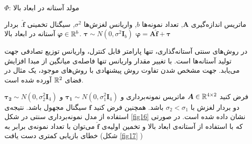 \begin{algorithm}
	\caption{$ \Phi $: مولد آستانه در ابعاد بالا}
	\label{alg:HDTG}
	\begin{algorithmic}[1]
		\renewcommand{\algorithmicrequire}{\textbf{ورودی:}}
		\renewcommand{\algorithmicensure}{\textbf{خروجی:}}
		\REQUIRE ماتریس اندازه‌گیری $ \bm{A} $, تعداد نمونه‌ها $ b $, واریانس لغزش‌ها $ \sigma^{2} $, سیگنال تخمینی $ \hat{\bm{f}} $.
		\ENSURE بردار آستانه در ابعاد بالا $\bm{\varphi}\in \mathbb{R}^{b}$.
		\STATE $ \bm{\tau}\sim N(0,\sigma^{2}\bm{I}_{b} ) $
		\STATE  $ \bm{\varphi}=\bm{A}\hat{\bm{f}}+\bm{\tau} $
	\end{algorithmic} 
\end{algorithm}


در روش‌های سنتی آستانه‌گذاری، تنها پارامتر قابل کنترل، واریانس توزیع تصادفی جهت تولید آستانه‌ها است. با تغییر مقدار واریانس تنها فاصله‌ی میانگین از مبدا افزایش می‌یابد. جهت مشخص شدن تفاوت روش پیشنهادی با روش‌های موجود، یک مثال در فضای
$\mathbb{R}^{2}$
آورده شده است.

فرض کنید
$ \bm{A}\in \mathbb{R}^{4\times 2} $
ماتریس نمونه‌برداری و
$ \bm{\bm{\tau}_{1}} \sim N(0,\sigma_{1}^{2}\bm{I}_{4})$
و
$ \bm{\bm{\tau}_{2}}\sim N(0,\sigma_{2}^{2}\bm{I}_{4}) $
دو بردار لغزش
با
$ \sigma_{2}< \sigma_{1} $
باشد.
همچنین فرض کنید
$ \bm{f} $
سیگنال مجهول باشد. نتیجه‌ی استفاده از مدل نمونه‌برداری سنتی در شکل 
\ref{fig16}
نشان داده شده است. در صورتی که با استفاده از آستانه‌ی ابعاد بالا و تخمین اولیه‌ی 
$\hat{\bm{f}}$
می‌توان با تعداد نمونه‌ی برابر به خطای بازیابی کمتری دست یافت (شکل
\ref{fig17}
)

